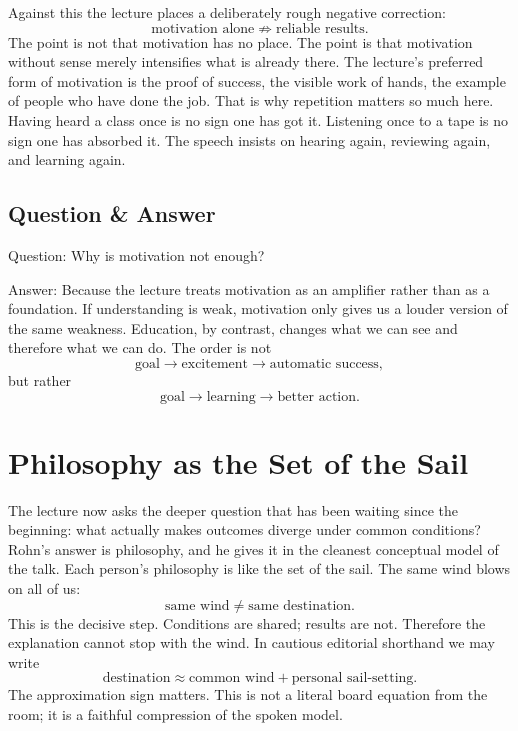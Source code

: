 Against this the lecture places a deliberately rough negative correction:
\begin{equation}
\text{motivation alone} \not\Rightarrow \text{reliable results}.
\end{equation}
The point is not that motivation has no place. The point is that motivation without sense merely intensifies what is already there. The lecture's preferred form of motivation is the proof of success, the visible work of hands, the example of people who have done the job. That is why repetition matters so much here. Having heard a class once is no sign one has got it. Listening once to a tape is no sign one has absorbed it. The speech insists on hearing again, reviewing again, and learning again.

\subsection{Question \& Answer}

Question: Why is motivation not enough?

Answer: Because the lecture treats motivation as an amplifier rather than as a foundation. If understanding is weak, motivation only gives us a louder version of the same weakness. Education, by contrast, changes what we can see and therefore what we can do. The order is not
\begin{equation}
\text{goal} \to \text{excitement} \to \text{automatic success},
\end{equation}
but rather
\begin{equation}
\text{goal} \to \text{learning} \to \text{better action}.
\end{equation}

\section{Philosophy as the Set of the Sail}

The lecture now asks the deeper question that has been waiting since the beginning: what actually makes outcomes diverge under common conditions? Rohn's answer is philosophy, and he gives it in the cleanest conceptual model of the talk. Each person's philosophy is like the set of the sail. The same wind blows on all of us:
\begin{equation}
\text{same wind} \neq \text{same destination}.
\end{equation}
This is the decisive step. Conditions are shared; results are not. Therefore the explanation cannot stop with the wind. In cautious editorial shorthand we may write
\begin{equation}
\text{destination} \approx \text{common wind} + \text{personal sail-setting}.
\end{equation}
The approximation sign matters. This is not a literal board equation from the room; it is a faithful compression of the spoken model.

